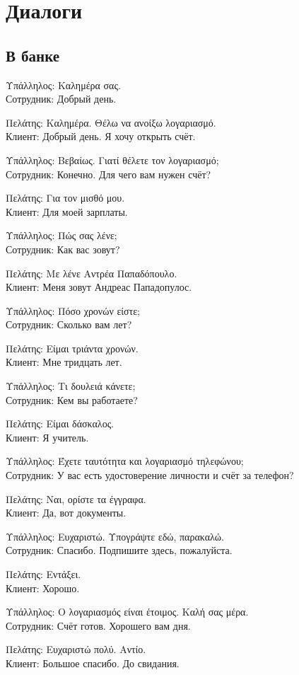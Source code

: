 \documentclass[12pt]{article}
\newcommand{\my}[1]{\textcolor{gray!80!white}{#1}}
\newenvironment{page}{\clearpage\normalsize\null\vfill}{\vfill\null}
\newenvironment{textblock}{\begin{minipage}{\textwidth}}{\end{minipage}\smallskip}
\newcommand{\dialogright}[2]{%
	\par\begingroup\raggedleft
	#1\\
	\my{#2}\par
	\endgroup
}
\begin{document}
	\begin{page}
		\section{Диалоги}
		\subsection{В банке}
		\scriptsize
		\begin{textblock}
			Υπάλληλος: Καλημέρα σας.\\
			\my{Сотрудник: Добрый день.}
			
			\dialogright{Πελάτης: Καλημέρα. Θέλω να ανοίξω λογαριασμό.}{Клиент: Добрый день. Я хочу открыть счёт.}
			
			Υπάλληλος: Βεβαίως. Γιατί θέλετε τον λογαριασμό;\\
			\my{Сотрудник: Конечно. Для чего вам нужен счёт?}
			
			\dialogright{Πελάτης: Για τον μισθό μου.}{Клиент: Для моей зарплаты.}
			
			Υπάλληλος: Πώς σας λένε;\\
			\my{Сотрудник: Как вас зовут?}
			
			\dialogright{Πελάτης: Με λένε Αντρέα Παπαδόπουλο.}{Клиент: Меня зовут Андреас Пападопулос.}
			
			Υπάλληλος: Πόσο χρονών είστε;\\
			\my{Сотрудник: Сколько вам лет?}
			
			\dialogright{Πελάτης: Είμαι τριάντα χρονών.}{Клиент: Мне тридцать лет.}
			
			Υπάλληλος: Τι δουλειά κάνετε;\\
			\my{Сотрудник: Кем вы работаете?}
			
			\dialogright{Πελάτης: Είμαι δάσκαλος.}{Клиент: Я учитель.}
			
			Υπάλληλος: Έχετε ταυτότητα και λογαριασμό τηλεφώνου;\\
			\my{Сотрудник: У вас есть удостоверение личности и счёт за телефон?}
			
			\dialogright{Πελάτης: Ναι, ορίστε τα έγγραφα.}{Клиент: Да, вот документы.}
			
			Υπάλληλος: Ευχαριστώ. Υπογράψτε εδώ, παρακαλώ.\\
			\my{Сотрудник: Спасибо. Подпишите здесь, пожалуйста.}
			
			\dialogright{Πελάτης: Εντάξει.}{Клиент: Хорошо.}
			
			Υπάλληλος: Ο λογαριασμός είναι έτοιμος. Καλή σας μέρα.\\
			\my{Сотрудник: Счёт готов. Хорошего вам дня.}
			
			\dialogright{Πελάτης: Ευχαριστώ πολύ. Αντίο.}{Клиент: Большое спасибо. До свидания.}
		\end{textblock}
	\end{page}
\end{document}
